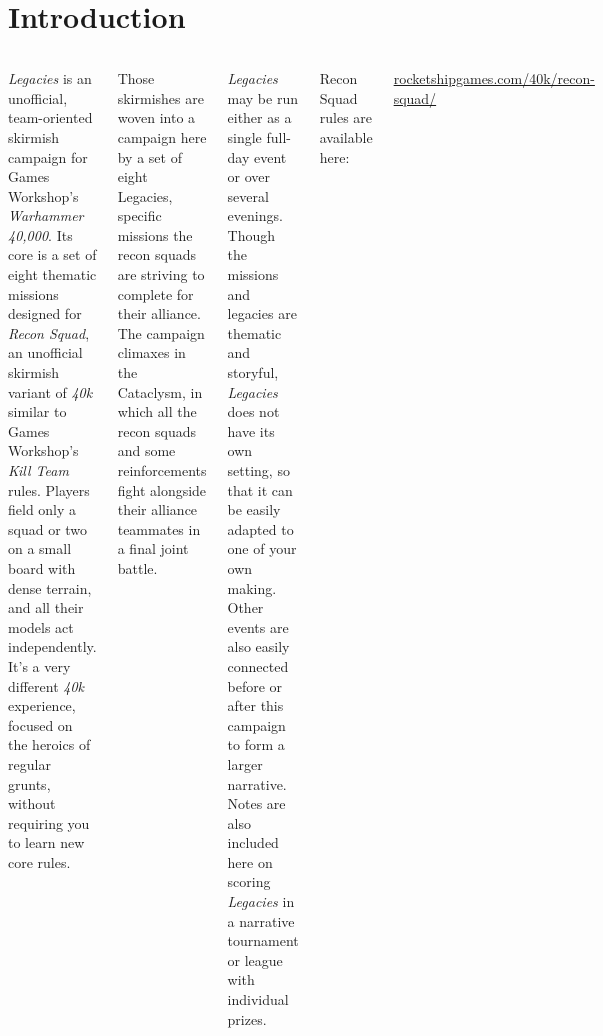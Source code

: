 \section{Introduction}

\begin{columns}

  \emph{Legacies} is an unofficial, team-oriented skirmish campaign
  for Games Workshop's \emph{Warhammer 40,000}.  Its core is a set of
  eight thematic missions designed for \emph{Recon Squad}, an
  unofficial skirmish variant of \emph{40k} similar to Games
  Workshop's \emph{Kill Team} rules.  Players field only a squad or
  two on a small board with dense terrain, and all their models act
  independently.  It's a very different \emph{40k} experience, focused
  on the heroics of regular grunts, without requiring you to learn new
  core rules.

  Those skirmishes are woven into a campaign here by a set of eight
  Legacies, specific missions the recon squads are striving to
  complete for their alliance.  The campaign climaxes in the
  Cataclysm, in which all the recon squads and some reinforcements
  fight alongside their alliance teammates in a final joint battle.

  \emph{Legacies} may be run either as a single full-day event or over
  several evenings.  Though the missions and legacies are thematic and
  storyful, \emph{Legacies} does not have its own setting, so that it
  can be easily adapted to one of your own making.  Other events are
  also easily connected before or after this campaign to form a larger
  narrative.  Notes are also included here on scoring \emph{Legacies}
  in a narrative tournament or league with individual prizes.

  Recon Squad rules are available here:

  \centerline{\url{rocketshipgames.com/40k/recon-squad/}}


\end{columns}
